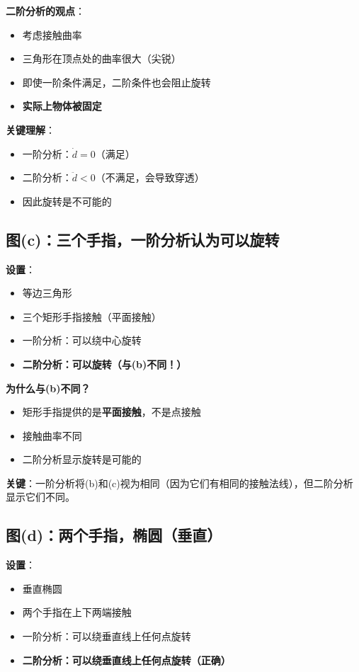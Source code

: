 \documentclass[12pt,a4paper]{article}
\begin{document}
\textbf{二阶分析的观点}：
\begin{itemize}
\item 考虑接触曲率
\item 三角形在顶点处的曲率很大（尖锐）
\item 即使一阶条件满足，二阶条件也会阻止旋转
\item \textbf{实际上物体被固定}
\end{itemize}

\textbf{关键理解}：
\begin{itemize}
\item 一阶分析：$\dot{d} = 0$（满足）
\item 二阶分析：$\ddot{d} < 0$（不满足，会导致穿透）
\item 因此旋转是不可能的
\end{itemize}

\subsection{图(c)：三个手指，一阶分析认为可以旋转}

\textbf{设置}：
\begin{itemize}
\item 等边三角形
\item 三个矩形手指接触（平面接触）
\item 一阶分析：可以绕中心旋转
\item \textbf{二阶分析：可以旋转（与(b)不同！）}
\end{itemize}

\textbf{为什么与(b)不同？}
\begin{itemize}
\item 矩形手指提供的是\textbf{平面接触}，不是点接触
\item 接触曲率不同
\item 二阶分析显示旋转是可能的
\end{itemize}

\textbf{关键}：一阶分析将(b)和(c)视为相同（因为它们有相同的接触法线），但二阶分析显示它们不同。

\subsection{图(d)：两个手指，椭圆（垂直）}

\textbf{设置}：
\begin{itemize}
\item 垂直椭圆
\item 两个手指在上下两端接触
\item 一阶分析：可以绕垂直线上任何点旋转
\item \textbf{二阶分析：可以绕垂直线上任何点旋转（正确）}
\end{itemize}
\end{document}
